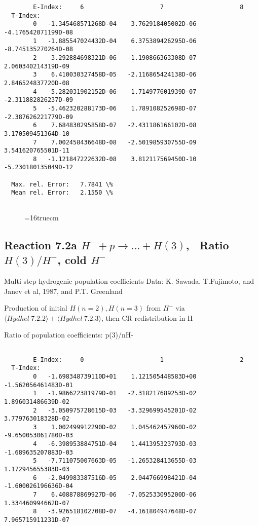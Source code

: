 \documentclass[12pt,dvipdfmx]{article}
\begin{document}
{\begin{small}
\begin{verbatim}
        E-Index:     6                     7                     8
  T-Index:
        0   -1.345468571268D-04    3.762918405002D-06   -4.176542071199D-08
        1   -1.885547024432D-04    6.375389426295D-06   -8.745135270264D-08
        2    3.292884698321D-06   -1.190866363308D-07    2.060340214319D-09
        3    6.410030327458D-05   -2.116865424138D-06    2.846524837720D-08
        4   -5.282031902152D-06    1.714977601939D-07   -2.311882826237D-09
        5   -5.462320288173D-06    1.789108252698D-07   -2.387626221779D-09
        6    7.684830295858D-07   -2.431186166102D-08    3.170509451364D-10
        7    7.002458436648D-08   -2.501985930755D-09    3.541620765501D-11
        8   -1.121847222632D-08    3.812117569450D-10   -5.230180135049D-12

  Max. rel. Error:   7.7841 \%
  Mean rel. Error:   2.1550 \%


\end{verbatim}\end{small}
\begin{figure} \label{2.2.15e}
\epsfxsize=16truecm
\end{figure}
\newpage






\subsection{
Reaction 7.2a $ H^- + p \rightarrow ...+ H(3) $, \   Ratio $H(3)/H^- $, cold $H^-$
}
Multi-step hydrogenic population coefficients
 Data: K. Sawada, T.Fujimoto, \cite{kn:Sawada} and Janev et al, 1987, and P.T. Greenland

Production of initial $H(n=2), H(n=3)$ from $H^-$ via $ \langle Hydhel~ 7.2.2\rangle + \langle Hydhel~ 7.2.3\rangle$,
 then CR redistribution in H

 Ratio of population coefficients: p(3)/nH-
\begin{small}\begin{verbatim}

        E-Index:     0                     1                     2
  T-Index:
        0   -1.698348739110D+01    1.121505448583D+00   -1.562056461483D-01
        1   -1.986622381979D-01   -2.318217689253D-02    1.896031486639D-02
        2   -3.050975728615D-03   -3.329699545201D-02    3.779763018328D-02
        3    1.002499912290D-02    1.045462457960D-02   -9.650053061780D-03
        4   -6.398953884751D-04    1.441395323793D-03   -1.689635207883D-03
        5   -7.711075007663D-05   -1.265328413655D-03    1.172945655383D-03
        6   -2.049983387516D-05    2.044766998421D-04   -1.600026196636D-04
        7    6.408878869927D-06   -7.052533095200D-06    1.334460994662D-07
        8   -3.926518102708D-07   -4.161804947648D-07    7.965715911231D-07


\end{verbatim}
\end{small}}
\end{document}
